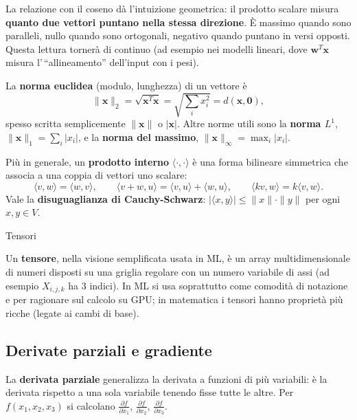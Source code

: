 La relazione con il coseno dà l'intuizione geometrica: il prodotto
scalare misura \textbf{quanto due vettori puntano nella stessa
direzione}. È massimo quando sono paralleli, nullo quando sono
ortogonali, negativo quando puntano in versi opposti. Questa lettura
tornerà di continuo (ad esempio nei modelli lineari, dove
\(\mathbf{w}^T\mathbf{x}\) misura l'\,``allineamento'' dell'input con i
pesi).

La \textbf{norma euclidea} (modulo, lunghezza) di un vettore è \[
\|\mathbf{x}\|_2 = \sqrt{\mathbf{x}^T\mathbf{x}} = \sqrt{\sum_i x_i^2} = d(\mathbf{x}, \mathbf{0}),
\] spesso scritta semplicemente \(\|\mathbf{x}\|\) o \(|\mathbf{x}|\).
Altre norme utili sono la \textbf{norma \(L^1\)},
\(\|\mathbf{x}\|_1 = \sum_i |x_i|\), e la \textbf{norma del massimo},
\(\|\mathbf{x}\|_\infty = \max_i |x_i|\).

Più in generale, un \textbf{prodotto interno}
\(\langle \cdot,\cdot \rangle\) è una forma bilineare simmetrica che
associa a una coppia di vettori uno scalare: \[
\langle v, w\rangle = \langle w, v\rangle, \qquad \langle v+w, u\rangle = \langle v,u\rangle + \langle w,u\rangle, \qquad \langle kv, w\rangle = k\langle v, w\rangle.
\] Vale la \textbf{disuguaglianza di Cauchy-Schwarz}:
\(|\langle x, y\rangle| \le \|x\|\cdot\|y\|\) per ogni \(x, y \in V\).

\begin{boxnote}{Tensori}

Un \textbf{tensore}, nella visione semplificata usata in ML, è un array
multidimensionale di numeri disposti su una griglia regolare con un
numero variabile di assi (ad esempio \(X_{i,j,k}\) ha 3 indici). In ML
si usa soprattutto come comodità di notazione e per ragionare sul
calcolo su GPU; in matematica i tensori hanno proprietà più ricche
(legate ai cambi di base).

\end{boxnote}

\subsection{Derivate parziali e
gradiente}\label{derivate-parziali-e-gradiente}

La \textbf{derivata parziale} generalizza la derivata a funzioni di più
variabili: è la derivata rispetto a una sola variabile tenendo fisse
tutte le altre. Per \(f(x_1, x_2, x_3)\) si calcolano
\(\frac{\partial f}{\partial x_1}\),
\(\frac{\partial f}{\partial x_2}\),
\(\frac{\partial f}{\partial x_3}\).

